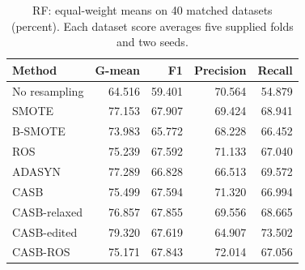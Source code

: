 \begin{table}[pos=!htbp]
\centering\small
\caption{RF: equal-weight means on 40 matched datasets (percent). Each dataset score averages five supplied folds and two seeds.}\label{tab:scores_rf}
\begin{tabular}{lrrrr}\toprule
Method & G-mean & F1 & Precision & Recall \\
\midrule
No resampling & 64.516 & 59.401 & 70.564 & 54.879 \\
SMOTE & 77.153 & 67.907 & 69.424 & 68.941 \\
B-SMOTE & 73.983 & 65.772 & 68.228 & 66.452 \\
ROS & 75.239 & 67.592 & 71.133 & 67.040 \\
ADASYN & 77.289 & 66.828 & 66.513 & 69.572 \\
CASB & 75.499 & 67.594 & 71.320 & 66.994 \\
CASB-relaxed & 76.857 & 67.855 & 69.556 & 68.665 \\
CASB-edited & 79.320 & 67.619 & 64.907 & 73.502 \\
CASB-ROS & 75.171 & 67.843 & 72.014 & 67.056 \\
\bottomrule\end{tabular}
\end{table}

